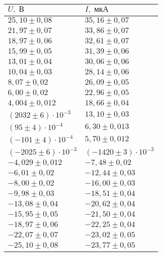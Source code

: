 \begin{tabular}{|l|l|}
\hline
$U,\;\text{В}$ & $I,\;\text{мкА}$\\\hline
$25{,}10 \pm 0{,}08$ & $35{,}16 \pm 0{,}07$\\\hline
$21{,}97 \pm 0{,}07$ & $33{,}86 \pm 0{,}07$\\\hline
$18{,}97 \pm 0{,}06$ & $32{,}61 \pm 0{,}07$\\\hline
$15{,}99 \pm 0{,}05$ & $31{,}39 \pm 0{,}06$\\\hline
$13{,}01 \pm 0{,}04$ & $30{,}06 \pm 0{,}06$\\\hline
$10{,}04 \pm 0{,}03$ & $28{,}14 \pm 0{,}06$\\\hline
$8{,}07 \pm 0{,}02$ & $26{,}09 \pm 0{,}05$\\\hline
$6{,}00 \pm 0{,}02$ & $22{,}96 \pm 0{,}05$\\\hline
$4{,}004 \pm 0{,}012$ & $18{,}66 \pm 0{,}04$\\\hline
$\left(2032 \pm 6\right)\cdot 10^{-3}$ & $13{,}10 \pm 0{,}03$\\\hline
$\left(95 \pm 4\right)\cdot 10^{-4}$ & $6{,}30 \pm 0{,}013$\\\hline
$\left(-101 \pm 4\right)\cdot 10^{-4}$ & $5{,}70 \pm 0{,}012$\\\hline
$\left(-2025 \pm 6\right)\cdot 10^{-3}$ & $\left(-1420 \pm 3\right)\cdot 10^{-3}$\\\hline
$-4{,}029 \pm 0{,}012$ & $-7{,}48 \pm 0{,}02$\\\hline
$-6{,}01 \pm 0{,}02$ & $-12{,}44 \pm 0{,}03$\\\hline
$-8{,}00 \pm 0{,}02$ & $-16{,}00 \pm 0{,}03$\\\hline
$-9{,}98 \pm 0{,}03$ & $-18{,}51 \pm 0{,}04$\\\hline
$-13{,}08 \pm 0{,}04$ & $-20{,}62 \pm 0{,}04$\\\hline
$-15{,}95 \pm 0{,}05$ & $-21{,}50 \pm 0{,}04$\\\hline
$-18{,}97 \pm 0{,}06$ & $-22{,}25 \pm 0{,}04$\\\hline
$-22{,}07 \pm 0{,}07$ & $-23{,}02 \pm 0{,}05$\\\hline
$-25{,}10 \pm 0{,}08$ & $-23{,}77 \pm 0{,}05$\\\hline
\end{tabular}

